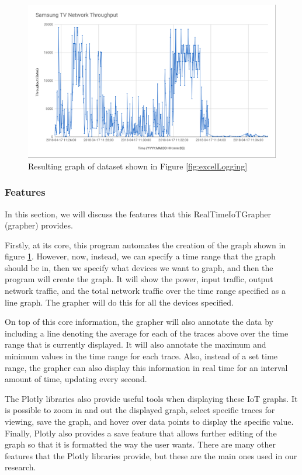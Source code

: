 \begin{figure}[H]
    \centering
    \includegraphics[width=1\textwidth]{figures/tvThroughput.png}
    \caption{Resulting graph of dataset shown in Figure \ref{fig:excelLogging}}
    \label{fig:tvThroughput}
\end{figure}

\subsubsection{Features}
\label{Features}

In this section, we will discuss the features that this RealTimeIoTGrapher (grapher) provides.

Firstly, at its core, this program automates the creation of the graph shown in figure \ref{fig:tvThroughput}. However, now, instead, we can specify a time range that the graph should be in, then we specify what devices we want to graph, and then the program will create the graph. It will show the power, input traffic, output network traffic, and the total network traffic over the time range specified as a line graph. The grapher will do this for all the devices specified.

On top of this core information, the grapher will also annotate the data by including a line denoting the average for each of the traces above over the time range that is currently displayed. It will also annotate the maximum and minimum values in the time range for each trace. Also, instead of a set time range, the grapher can also display this information in real time for an interval amount of time, updating every second.

The Plotly libraries also provide useful tools when displaying these IoT graphs. It is possible to zoom in and out the displayed graph, select specific traces for viewing, save the graph, and hover over data points to display the specific value. Finally, Plotly also provides a save feature that allows further editing of the graph so that it is formatted the way the user wants. There are many other features that the Plotly libraries provide, but these are the main ones used in our research.


